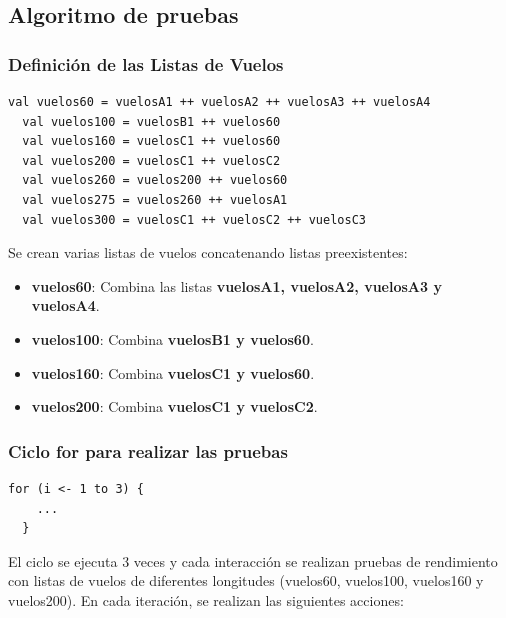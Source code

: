 \documentclass[letterpaper]{article}
\begin{document}
\subsection{Algoritmo de pruebas}

\subsubsection{Definición de las Listas de Vuelos}

\begin{lstlisting}[caption={Definición de las Listas de Vuelos}, label={lst:vuelos}, captionpos=listaVuelos]
  val vuelos60 = vuelosA1 ++ vuelosA2 ++ vuelosA3 ++ vuelosA4
  val vuelos100 = vuelosB1 ++ vuelos60
  val vuelos160 = vuelosC1 ++ vuelos60
  val vuelos200 = vuelosC1 ++ vuelosC2
  val vuelos260 = vuelos200 ++ vuelos60
  val vuelos275 = vuelos260 ++ vuelosA1
  val vuelos300 = vuelosC1 ++ vuelosC2 ++ vuelosC3
\end{lstlisting}

Se crean varias listas de vuelos concatenando listas preexistentes:

\begin{itemize}
    \item \textbf{vuelos60}: Combina las listas \textbf{vuelosA1, vuelosA2, vuelosA3 y vuelosA4}.
    \item \textbf{vuelos100}: Combina  \textbf{vuelosB1 y vuelos60}.
    \item \textbf{vuelos160}: Combina  \textbf{vuelosC1 y vuelos60}.
    \item \textbf{vuelos200}: Combina  \textbf{vuelosC1 y vuelosC2}.
\end{itemize}

\subsubsection{Ciclo for para realizar las pruebas}

\begin{lstlisting}[caption={Ciclo for para realizar las pruebas}, label={lst:ciclo}, captionpos=cicloFor]
  for (i <- 1 to 3) {
    ...
  }
\end{lstlisting}

El ciclo se ejecuta 3 veces y cada interacción se realizan pruebas de rendimiento 
con listas de vuelos de diferentes longitudes (vuelos60, vuelos100, vuelos160 y vuelos200). 
En cada iteración, se realizan las siguientes acciones:
\end{document}
